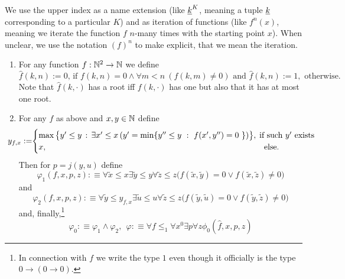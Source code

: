 We use the upper index as a name extension (like $\underline k^K$, meaning a tuple $\underline k$ corresponding to a particular $K$) and as iteration of functions (like $f^n(x)$, meaning we iterate the function $f$ $n$-many times with the starting point $x$). When unclear, we use the notation $(f)^n$ to make explicit, that we mean the iteration.

\begin{dfn}%

\begin{enumerate}

\item

For any function $f:\mathbb{N}^2\to \mathbb{N}$ we define \[ 
\mbox{$\widehat{f}(k,n):=0$, 
if $f(k,n)=0\wedge\forall m<n\ (f(k,m)\neq 0)$ and $\widehat{f}(k,n):=1,$ 
otherwise.}\] Note that $\widehat{f}(k,\cdot)$ has a root iff $f(k,\cdot)$ has 
one but also that it has at most one root.
\item 
For any $f$ as above and $x,y\in\mathbb{N}$ define
\[ \hspace*{-5mm}
y_{f,x}:=\hspace*{-1mm}\begin{cases}
\max\big\{y'\leq y\, :\, \exists x'\le x\,
(y'=\min\{y''\leq y\ :\ f(x',y'')=0
\ \})\big\},& \hspace*{-2mm} \text{if such $y'$ exists}\\
x,&\Telse.
\end{cases}
\]
Then for $p=j(y,u)$ define 
\[ \varphi_1(f,x,p,z): \equiv
\forall \tilde x \leq x \exists \tilde y\leq y \forall \tilde z\leq z 
\big(f(\tilde x,\tilde y)=0\vee f(\tilde x,\tilde z)\neq0\big) \] 
and 
\[ \varphi_2(f,x,p,z):\equiv 
\forall \tilde y \leq y_{f,x} \exists \tilde u\leq u \forall \tilde z\leq z 
\big(f(\tilde y,\tilde u)=0\vee f(\tilde y,\tilde z)\neq0\big) \] 
and, finally,\footnote{In connection with $f$ we write the type $1$ even 
though it officially is the type $0\to (0\to 0).$} 
\[ \varphi_0:\equiv \varphi_1\wedge\varphi_2, \ \ \varphi:\equiv
\forall f\leq_1  \forall x^0 \exists p  \forall z \phi_0 
(\widehat{f},x,p,z)
\]
\end{enumerate}
\end{dfn}

